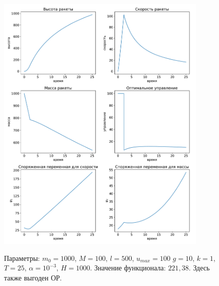 \documentclass[12pt, a4paper]{article} %
\begin{document}
\begin{figure}[H]
\begin{center}
    \includegraphics[width=0.9\textwidth]{2_2.pdf}
    \label{fig:1_5}
    \caption{Параметры: $m_0=1000$, $M=100$,  $l=500$,  $u_{max}=100$
        $g=10$,  $k=1$,  $T=25$, $\alpha=10^{-3}$,  $H=1000$.
        Значение функционала: $221{,}38$.
        Здесь также выгоден ОР.}
\end{center} 
\end{figure}
\end{document}
